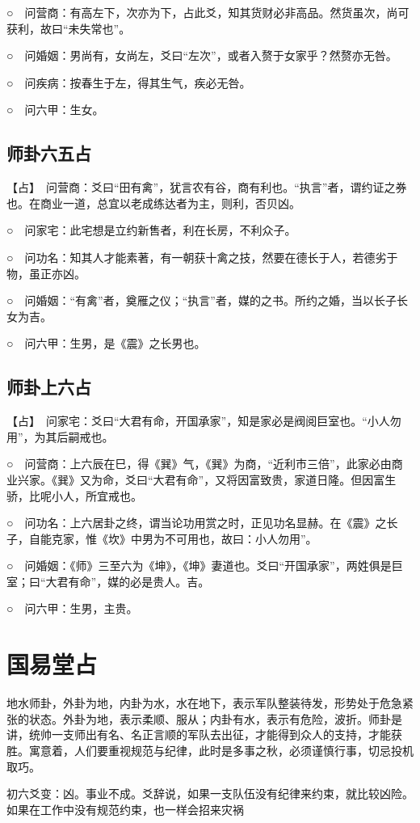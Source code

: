 \documentclass[12pt,oneside]{book}
\begin{document}
○　问营商：有高左下，次亦为下，占此爻，知其货财必非高品。然货虽次，尚可获利，故曰“未失常也”。

○　问婚姻：男尚有，女尚左，爻曰“左次”，或者入赘于女家乎？然赘亦无咎。

○　问疾病：按春生于左，得其生气，疾必无咎。

○　问六甲：生女。

\subsection{师卦六五占}
【占】　问营商：爻曰“田有禽”，犹言农有谷，商有利也。“执言”者，谓约证之券也。在商业一道，总宜以老成练达者为主，则利，否贝凶。

○　问家宅：此宅想是立约新售者，利在长房，不利众子。

○　问功名：知其人才能素著，有一朝获十禽之技，然要在德长于人，若德劣于物，虽正亦凶。

○　问婚姻：“有禽”者，奠雁之仪；“执言”者，媒的之书。所约之婚，当以长子长女为吉。

○　问六甲：生男，是《震》之长男也。

\subsection{师卦上六占}
【占】　问家宅：爻曰“大君有命，开国承家”，知是家必是阀阅巨室也。“小人勿用”，为其后嗣戒也。

○　问营商：上六辰在巳，得《巽》气，《巽》为商，“近利市三倍”，此家必由商业兴家。《巽》又为命，爻曰“大君有命”，又将因富致贵，家道日隆。但因富生骄，比呢小人，所宜戒也。

○　问功名：上六居卦之终，谓当论功用赏之时，正见功名显赫。在《震》之长子，自能克家，惟《坎》中男为不可用也，故曰：小人勿用”。

○　问婚姻：《师》三至六为《坤》，《坤》妻道也。爻曰“开国承家”，两姓俱是巨室；曰“大君有命”，媒的必是贵人。吉。

○　问六甲：生男，主贵。

\section{国易堂占}
地水师卦，外卦为地，内卦为水，水在地下，表示军队整装待发，形势处于危急紧张的状态。外卦为地，表示柔顺、服从；内卦有水，表示有危险，波折。师卦是讲，统帅一支师出有名、名正言顺的军队去出征，才能得到众人的支持，才能获胜。寓意着，人们要重视规范与纪律，此时是多事之秋，必须谨慎行事，切忌投机取巧。

初六爻变：凶。事业不成。爻辞说，如果一支队伍没有纪律来约束，就比较凶险。如果在工作中没有规范约束，也一样会招来灾祸
\end{document}

